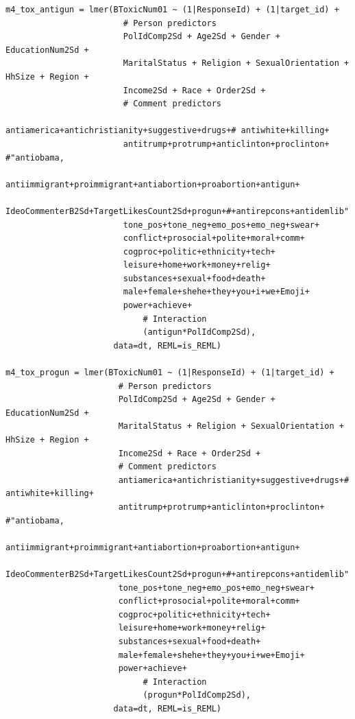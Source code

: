 \documentclass{article}
\begin{document}
\begin{lstlisting}
m4_tox_antigun = lmer(BToxicNum01 ~ (1|ResponseId) + (1|target_id) + 
                        # Person predictors
                        PolIdComp2Sd + Age2Sd + Gender + EducationNum2Sd + 
                        MaritalStatus + Religion + SexualOrientation + HhSize + Region + 
                        Income2Sd + Race + Order2Sd + 
                        # Comment predictors  
                        antiamerica+antichristianity+suggestive+drugs+# antiwhite+killing+
                        antitrump+protrump+anticlinton+proclinton+ #"antiobama,
                        antiimmigrant+proimmigrant+antiabortion+proabortion+antigun+
                        IdeoCommenterB2Sd+TargetLikesCount2Sd+progun+#+antirepcons+antidemlib"
                        tone_pos+tone_neg+emo_pos+emo_neg+swear+
                        conflict+prosocial+polite+moral+comm+
                        cogproc+politic+ethnicity+tech+
                        leisure+home+work+money+relig+  
                        substances+sexual+food+death+    
                        male+female+shehe+they+you+i+we+Emoji+
                        power+achieve+
                            # Interaction
                            (antigun*PolIdComp2Sd),
                      data=dt, REML=is_REML)

m4_tox_progun = lmer(BToxicNum01 ~ (1|ResponseId) + (1|target_id) +
                       # Person predictors
                       PolIdComp2Sd + Age2Sd + Gender + EducationNum2Sd + 
                       MaritalStatus + Religion + SexualOrientation + HhSize + Region + 
                       Income2Sd + Race + Order2Sd + 
                       # Comment predictors  
                       antiamerica+antichristianity+suggestive+drugs+# antiwhite+killing+
                       antitrump+protrump+anticlinton+proclinton+ #"antiobama,
                       antiimmigrant+proimmigrant+antiabortion+proabortion+antigun+
                       IdeoCommenterB2Sd+TargetLikesCount2Sd+progun+#+antirepcons+antidemlib"
                       tone_pos+tone_neg+emo_pos+emo_neg+swear+
                       conflict+prosocial+polite+moral+comm+
                       cogproc+politic+ethnicity+tech+
                       leisure+home+work+money+relig+  
                       substances+sexual+food+death+    
                       male+female+shehe+they+you+i+we+Emoji+
                       power+achieve+
                            # Interaction
                            (progun*PolIdComp2Sd),
                      data=dt, REML=is_REML)





\end{lstlisting}
\end{document}
